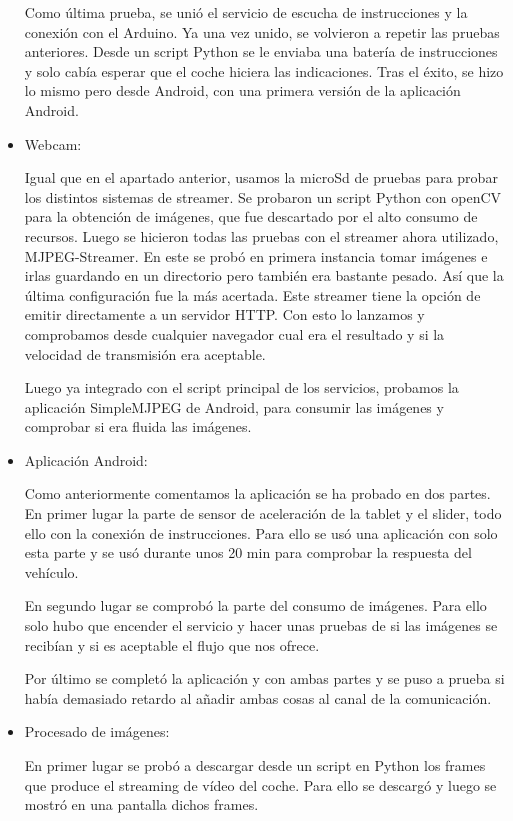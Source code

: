 \documentclass{pclass}
\begin{document}
\begin{itemize}
		Como última prueba, se unió el servicio de escucha de instrucciones y la conexión con el Arduino. Ya una vez unido, se volvieron a repetir las pruebas anteriores. Desde un script Python se le enviaba una batería de instrucciones y solo cabía esperar que el coche hiciera las indicaciones. Tras el éxito, se hizo lo mismo pero desde Android, con una primera versión de la aplicación Android.
		
	
	
	\item Webcam:
	
		Igual que en el apartado anterior, usamos la microSd de pruebas para probar los distintos sistemas de streamer. Se probaron un script Python con openCV para la obtención de imágenes, que fue descartado por el alto consumo de recursos. Luego se hicieron todas las pruebas con el streamer ahora utilizado, MJPEG-Streamer. En este se probó en primera instancia tomar imágenes e irlas guardando en un directorio pero también era bastante pesado. Así que la última configuración fue la más acertada. Este streamer tiene la opción de emitir directamente a un servidor HTTP. Con esto lo lanzamos y comprobamos desde cualquier navegador cual era el resultado y si la velocidad de transmisión era aceptable.
		
		Luego ya integrado con el script principal de los servicios, probamos la aplicación SimpleMJPEG de Android, para consumir las imágenes y comprobar si era fluida las imágenes.
	
	\item Aplicación Android:
	
		Como anteriormente comentamos la aplicación se ha probado en dos partes. En primer lugar la parte de sensor de aceleración de la tablet y el slider, todo ello con la conexión de instrucciones. Para ello se usó una aplicación con solo esta parte y se usó durante unos 20 min para comprobar la respuesta del vehículo.
		
		En segundo lugar se comprobó la parte del consumo de imágenes. Para ello solo hubo que encender el servicio y hacer unas pruebas de si las imágenes se recibían y si es aceptable el flujo que nos ofrece.
		
		Por último se completó la aplicación y con ambas partes y se puso a prueba si había demasiado retardo al añadir ambas cosas al canal de la comunicación.
		
	\item Procesado de imágenes:
	
		En primer lugar se probó a descargar desde un script en Python los frames que produce el streaming de vídeo del coche. Para ello se descargó y luego se mostró en una pantalla dichos frames.
		

\end{itemize}
\end{document}
